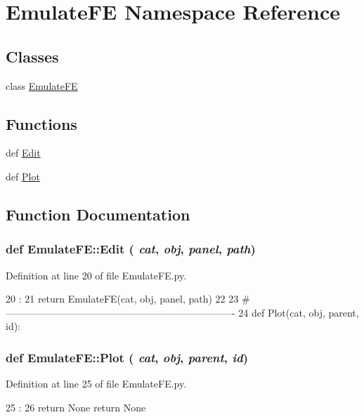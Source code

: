 \hypertarget{namespaceEmulateFE}{
\section{EmulateFE Namespace Reference}
\label{namespaceEmulateFE}
}
\subsection*{Classes}
\begin{DoxyCompactItemize}
\item 
class \hyperlink{classEmulateFE_1_1EmulateFE}{EmulateFE}
\end{DoxyCompactItemize}
\subsection*{Functions}
\begin{DoxyCompactItemize}
\item 
def \hyperlink{namespaceEmulateFE_a474afc4046b6c35815aefb9c8d9e5646}{Edit}
\item 
def \hyperlink{namespaceEmulateFE_ac977ea020313c363c6737f44f2ed0eb3}{Plot}
\end{DoxyCompactItemize}


\subsection{Function Documentation}
\hypertarget{namespaceEmulateFE_a474afc4046b6c35815aefb9c8d9e5646}{
\subsubsection[{Edit}]{\setlength{\rightskip}{0pt plus 5cm}def EmulateFE::Edit ( {\em cat}, \/   {\em obj}, \/   {\em panel}, \/   {\em path})}}
\label{namespaceEmulateFE_a474afc4046b6c35815aefb9c8d9e5646}


Definition at line 20 of file EmulateFE.py.


\begin{DoxyCode}
20                                 :
21     return EmulateFE(cat, obj, panel, path)
22 
23 #----------------------------------------------------------------------
24 
def Plot(cat, obj, parent, id):
\end{DoxyCode}
\hypertarget{namespaceEmulateFE_ac977ea020313c363c6737f44f2ed0eb3}{
\subsubsection[{Plot}]{\setlength{\rightskip}{0pt plus 5cm}def EmulateFE::Plot ( {\em cat}, \/   {\em obj}, \/   {\em parent}, \/   {\em id})}}
\label{namespaceEmulateFE_ac977ea020313c363c6737f44f2ed0eb3}


Definition at line 25 of file EmulateFE.py.


\begin{DoxyCode}
25                               :
26     return None
    return None
\end{DoxyCode}
